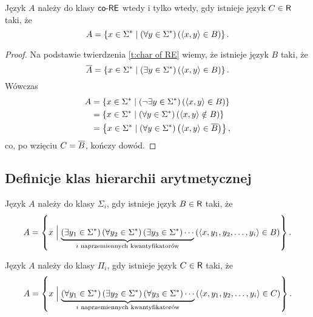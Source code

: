 \begin{theorem}\label{t:char of coRE}
    Język $A$ należy do klasy $\textsf{co-RE}$ wtedy i tylko wtedy, gdy istnieje język $C \in \textsf{R}$ taki, że
    \[ A = \left\{x \in \Sigma^* \mid \left(\forall y \in \Sigma^* \right) \left(\left\langle x, y \right\rangle \in B\right) \right\}. \]
\end{theorem}
\begin{proof}
    Na podstawie twierdzenia \ref{t:char of RE} wiemy, że istnieje język $B$ taki, że
    \[ \overline{A} = \left\{x \in \Sigma^* \mid \left(\exists y \in \Sigma^* \right) \left(\left\langle x, y \right\rangle \in B\right) \right\}. \]
    Wówczas
    \begin{align*}
        A &= \left\{x \in \Sigma^* \mid \left(\neg\exists y \in \Sigma^* \right) \left(\left\langle x, y \right\rangle \in B\right) \right\} \\
        &= \left\{x \in \Sigma^* \mid \left(\forall y \in \Sigma^* \right) \left(\left\langle x, y \right\rangle \notin B\right) \right\} \\
        &= \left\{x \in \Sigma^* \mid \left(\forall y \in \Sigma^* \right) \left(\left\langle x, y \right\rangle \in \overline{B}\right) \right\},
    \end{align*}
    co, po wzięciu $C = \overline{B}$, kończy dowód.
\end{proof}

\subsection{Definicje klas hierarchii arytmetycznej}

\begin{definition}
    Język $A$ należy do klasy $\Sigma_i$, gdy istnieje język $B \in \textsf{R}$ taki, że
    \[ A = \left\{x \Bigm|
    \underbrace{\left(\exists y_1 \in \Sigma^*\right) \left(\forall y_2 \in \Sigma^*\right) \left(\exists y_3 \in \Sigma^*\right) \cdots}_{i \text{ naprzemiennych kwantyfikatorów}}
    \left(\left\langle x, y_1, y_2, \ldots, y_i \right\rangle \in B\right)\right\}. \]
\end{definition}

\begin{definition}[klasa $\Pi_i$]
    Język $A$ należy do klasy $\Pi_i$, gdy istnieje język $C \in \textsf{R}$ taki, że
    \[ A = \left\{x \Bigm|
    \underbrace{\left(\forall y_1 \in \Sigma^*\right) \left(\exists y_2 \in \Sigma^*\right) \left(\forall y_3 \in \Sigma^*\right) \cdots}_{i \text{ naprzemiennych kwantyfikatorów}}
    \left(\left\langle x, y_1, y_2, \ldots, y_i \right\rangle \in C\right)\right\}. \]
\end{definition}

